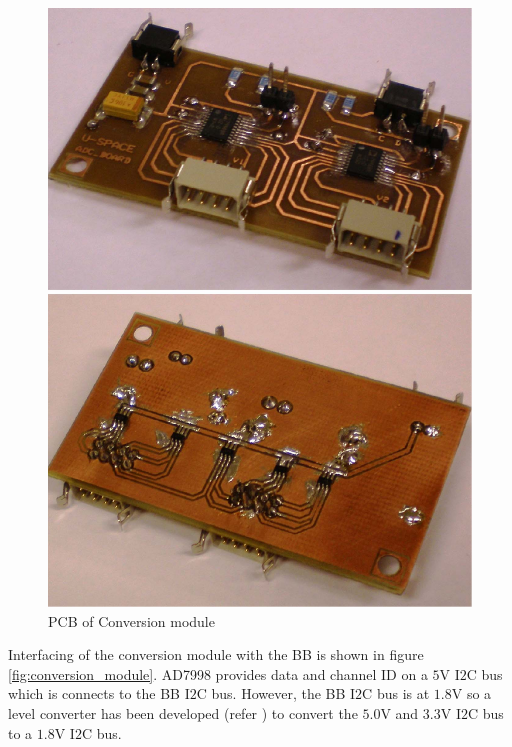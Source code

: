 \begin{figure}[bht]
\centering
\includegraphics[scale=0.45]{figures/PCB_conversion_module.pdf}
\caption{\ac{PCB} of Conversion module}
\label{fig:PCB_conversion_module}
\end{figure}
%
Interfacing of the conversion module with the \ac{BB} is shown in figure \ref{fig:conversion_module}. AD7998 provides data and channel ID on a $5$V I$2$C bus which is connects to the BB I$2$C bus. However, the \ac{BB} I$2$C bus is at $1.8$V so a level converter has been developed (refer \cite{CDR}) to convert the $5.0$V and $3.3$V I$2$C bus to a $1.8$V I$2$C bus.
%

